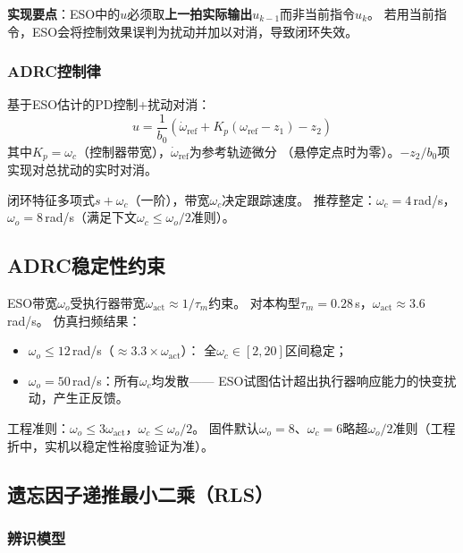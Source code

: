 \textbf{实现要点}：ESO中的$u$必须取\textbf{上一拍实际输出}$u_{k-1}$而非当前指令$u_k$。
若用当前指令，ESO会将控制效果误判为扰动并加以对消，导致闭环失效。

\subsubsection{ADRC控制律}

基于ESO估计的PD控制+扰动对消：
\begin{equation}
    \boxed{
    u = \frac{1}{b_0}\left(\dot{\omega}_{\mathrm{ref}}
        + K_p(\omega_{\mathrm{ref}} - z_1) - z_2\right)
    }
    \label{eq:adrc_law}
\end{equation}
其中$K_p=\omega_c$（控制器带宽），$\dot{\omega}_{\mathrm{ref}}$为参考轨迹微分
（悬停定点时为零）。$-z_2/b_0$项实现对总扰动的实时对消。

闭环特征多项式$s+\omega_c$（一阶），带宽$\omega_c$决定跟踪速度。
推荐整定：$\omega_c=4$\,rad/s，$\omega_o=8$\,rad/s（满足下文$\omega_c\leq\omega_o/2$准则）。

\subsection{ADRC稳定性约束}
\label{sec:adrc_stability}

ESO带宽$\omega_o$受执行器带宽$\omega_{\mathrm{act}}\approx1/\tau_m$约束。
对本构型$\tau_m=0.28$\,s，$\omega_{\mathrm{act}}\approx3.6$\,rad/s。
仿真扫频结果：
\begin{itemize}
    \item $\omega_o\leq12$\,rad/s（$\approx3.3\times\omega_{\mathrm{act}}$）：
          全$\omega_c\in[2,20]$区间稳定；
    \item $\omega_o=50$\,rad/s：所有$\omega_c$均发散——
          ESO试图估计超出执行器响应能力的快变扰动，产生正反馈。
\end{itemize}
工程准则：$\omega_o\leq3\omega_{\mathrm{act}}$，$\omega_c\leq\omega_o/2$。
固件默认$\omega_o=8$、$\omega_c=6$略超$\omega_o/2$准则（工程折中，实机以稳定性裕度验证为准）。

\subsection{遗忘因子递推最小二乘（RLS）}
\label{sec:online_id}
\label{sec:rls}

\subsubsection{辨识模型}

